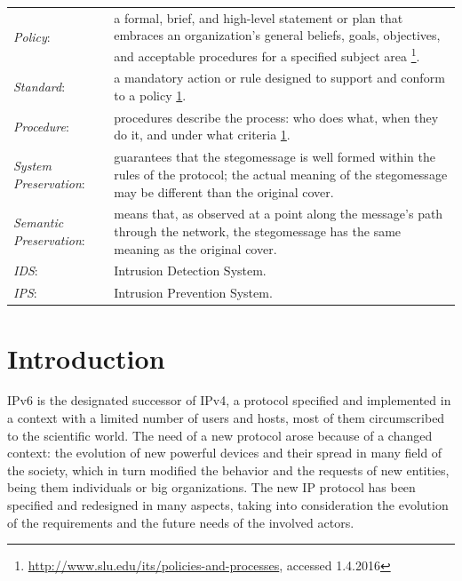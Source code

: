 \documentclass[12pt]{article}
\begin{document}
\begin{savenotes}
\begin{tabular}{L{3.3cm}L{12cm}}
\hdashline
\textit{Policy}:&a formal, brief, and high-level statement or plan that embraces an organization's general beliefs, goals, objectives, and acceptable procedures for a specified subject area \footnote{\label{policy}\url{http://www.slu.edu/its/policies-and-processes}, accessed 1.4.2016}.\\
\hdashline
\textit{Standard}:&a mandatory action or rule designed to support and conform to a policy \cref{policy}.\\
\hdashline
\textit{Procedure}:&procedures describe the process: who does what, when they do it, and under what criteria \cref{policy}.\\
\hdashline
\textit{System Preservation}:&guarantees that the stegomessage is well formed within the rules of the protocol; the actual meaning of the stegomessage may be different than the original cover\cite{lucena2}.\\
\hdashline
\textit{Semantic Preservation}:&means that, as observed at a point along the message’s path through the network, the stegomessage has the same meaning as the original cover\cite{lucena2}.\\
\hdashline
\textit{IDS}:&Intrusion Detection System.\\
\hdashline
\textit{IPS}:&Intrusion Prevention System.\\
\end{tabular}
\end{savenotes}



\pagebreak

\tableofcontents
\newpage
\listoffigures
\pagebreak
\listoftables
\pagebreak

\section{Introduction}
\label{sec:1}


IPv6 is the designated successor of IPv4, a protocol specified and implemented in a context with a limited number of users and hosts, most of them circumscribed to the scientific world. The need of a new protocol arose because of a changed context: the evolution of new powerful devices and their spread in many field of the society, which in turn modified the behavior and the requests of new entities, being them individuals or big organizations. The new IP protocol has been specified and redesigned in many aspects, taking into consideration the evolution of the requirements and the future needs of the involved actors.
\end{document}
